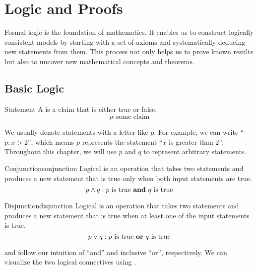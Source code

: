 \chapter{Logic and Proofs}

Formal logic is the foundation of mathematics. It enables us to construct logically consistent models by starting with a set of axioms and systematically deducing new statements from them. This process not only helps us to prove known results but also to uncover new mathematical concepts and theorems.

\section{Basic Logic}
\begin{dfnbox}{Statement}{}
    A  is a claim that is either true or false.
    \tcblower
    \[ p : \text{some claim} \]
\end{dfnbox}

We usually denote statements with a letter like $p$. For example, we can write ``$p: x > 2$'', which means $p$ represents the statement ``$x$ is greater than $2$''. Throughout this chapter, we will use $p$ and $q$ to represent arbitrary statements.

\begin{dfnbox}{Conjunction}{conjunction}
    Logical  is an operation that takes two statements and produces a new statement that is true only when both input statements are true.
    \tcblower
    \[ p \land q : p\ \text{is true \textbf{and}}\ q\ \text{is true} \]
\end{dfnbox}

\begin{dfnbox}{Disjunction}{disjunction}
    Logical  is an operation that takes two statements and produces a new statement that is true when at least one of the input statements is true.    \tcblower
    \[ p \lor q : p\ \text{is true \textbf{or}}\ q\ \text{is true} \]
\end{dfnbox}

 and  follow our intuition of ``and'' and inclusive ``or'', respectively. We can visualize the two logical connectives using .

